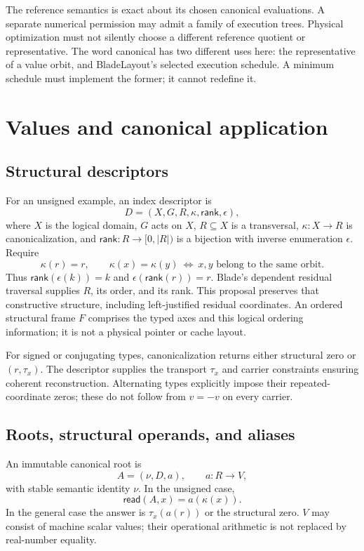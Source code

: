 \documentclass[11pt]{article}
\newcommand{\rd}{\mathsf{read}}
\begin{document}
The reference semantics is exact about its chosen canonical evaluations. A separate numerical permission may admit a family of execution trees. Physical optimization must not silently choose a different reference quotient or representative. The word canonical has two different uses here: the representative of a value orbit, and BladeLayout's selected execution schedule. A minimum schedule must implement the former; it cannot redefine it.

\section{Values and canonical application}
\subsection{Structural descriptors}
For an unsigned example, an index descriptor is
\[
 D=(X,G,R,\kappa,\mathsf{rank},\epsilon),
\]
where $X$ is the logical domain, $G$ acts on $X$, $R\subseteq X$ is a transversal, $\kappa:X\to R$ is canonicalization, and $\mathsf{rank}:R\to[0,|R|)$ is a bijection with inverse enumeration $\epsilon$. Require
\[
 \kappa(r)=r,\qquad
 \kappa(x)=\kappa(y)\ \Longleftrightarrow\ x,y\text{ belong to the same orbit}.
\]
Thus $\mathsf{rank}(\epsilon(k))=k$ and $\epsilon(\mathsf{rank}(r))=r$. Blade's dependent residual traversal supplies $R$, its order, and its rank. This proposal preserves that constructive structure, including left-justified residual coordinates. An ordered structural frame $F$ comprises the typed axes and this logical ordering information; it is not a physical pointer or cache layout.

For signed or conjugating types, canonicalization returns either structural zero or $(r,\tau_x)$. The descriptor supplies the transport $\tau_x$ and carrier constraints ensuring coherent reconstruction. Alternating types explicitly impose their repeated-coordinate zeros; these do not follow from $v=-v$ on every carrier.

\subsection{Roots, structural operands, and aliases}
An immutable canonical root is
\[
 A=(\nu,D,a),\qquad a:R\to V,
\]
with stable semantic identity $\nu$. In the unsigned case,
\[
 \rd(A,x)=a(\kappa(x)).
\]
In the general case the answer is $\tau_x(a(r))$ or the structural zero. $V$ may consist of machine scalar values; their operational arithmetic is not replaced by real-number equality.
\end{document}
